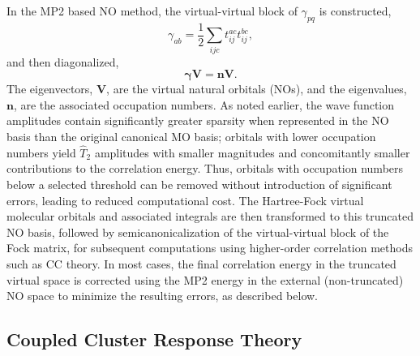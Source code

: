 In the MP2 based NO method, the virtual-virtual block of $\gamma_{pq}$
is constructed,
\begin{equation}
\gamma_{ab} = \frac{1}{2}\sum_{ijc} t^{ac}_{ij}t^{bc}_{ij},
\label{Eq:dens}
\end{equation}
and then diagonalized,
\begin{equation}
\bm{\gamma} \bm{V} = \bm{n} \bm{V}.
\end{equation}
The eigenvectors, $\bm{V}$, are the virtual natural orbitals (NOs), and the
eigenvalues, $\bm{n}$, are the associated occupation numbers.  As noted
earlier, the wave function amplitudes contain significantly greater sparsity
when represented in the NO basis than the original canonical MO basis;
orbitals with lower occupation numbers yield $\hat{T}_2$ amplitudes with
smaller magnitudes and concomitantly smaller contributions to the correlation
energy.  Thus, orbitals with occupation numbers below a selected threshold can
be removed without introduction of significant errors, leading to reduced
computational cost.  The Hartree-Fock virtual molecular orbitals and
associated integrals are then transformed to this truncated NO basis, followed
by semicanonicalization of the virtual-virtual block of the Fock matrix, for
subsequent computations using higher-order correlation methods such as CC
theory.  In most cases, the final correlation energy in the truncated virtual
space is corrected using the MP2 energy in the external (non-truncated) NO
space to minimize the resulting errors, as described below.

\subsection{Coupled Cluster Response Theory}

